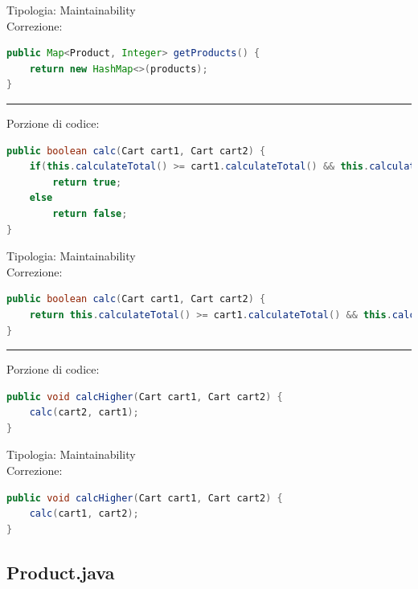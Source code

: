 \documentclass{article}
\begin{document}
Tipologia: Maintainability\\
Correzione: 
\begin{lstlisting}[language=Java]
public Map<Product, Integer> getProducts() {
    return new HashMap<>(products);
}
\end{lstlisting}
\vspace{.5em}\hrule\vspace{.5em}
Porzione di codice:
\begin{lstlisting}[language=Java]
public boolean calc(Cart cart1, Cart cart2) {
    if(this.calculateTotal() >= cart1.calculateTotal() && this.calculateTotal() >= cart2.calculateTotal())
        return true;
    else 
        return false;
}
\end{lstlisting}
Tipologia: Maintainability\\
Correzione:
\begin{lstlisting}[language=Java]
public boolean calc(Cart cart1, Cart cart2) {
    return this.calculateTotal() >= cart1.calculateTotal() && this.calculateTotal() >= cart2.calculateTotal();
}
\end{lstlisting}
\vspace{.5em}\hrule\vspace{.5em}
Porzione di codice:
\begin{lstlisting}[language=Java]
public void calcHigher(Cart cart1, Cart cart2) {
    calc(cart2, cart1);
}
\end{lstlisting}
Tipologia: Maintainability\\
Correzione:
\begin{lstlisting}[language=Java]
public void calcHigher(Cart cart1, Cart cart2) {
    calc(cart1, cart2);
}
\end{lstlisting}

\subsection{Product.java}
\end{document}
